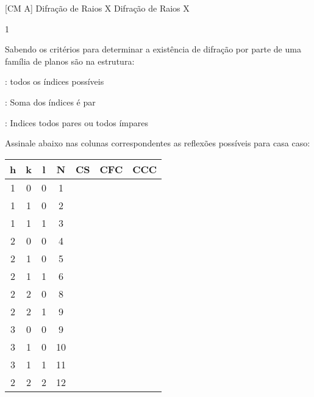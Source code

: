 \documentclass[\mainfilename]{subfiles}
\begin{document}

[CM A]
{Difração de Raios X} %
{Difração de Raios X} %


\setcounter{question}{6}

\begin{questionBox}1{ %
    Sabendo os critérios para determinar a existência de difração por parte de uma família de planos são na estrutura:
    \begin{description}[
    ]
        \item [Cúbica simples (CS)]: todos os índices possíveis
        \item [Cúbica de Corpo Centrado (CCC)]: Soma dos índices é par
        \item [Cúbica de Faces Centradas (CFC)]: Indices todos pares ou todos ímpares
    \end{description}
    Assinale abaixo nas colunas correspondentes as reflexões possíveis para casa caso:
} %
    \begin{center}
        \vspace{1ex}
        \begin{tabular}{*{7}{C}}
            \toprule
            
                h & k & l & N & CS & CFC & CCC
            
            \\\midrule
            
                   1 & 0 & 0 &  1 &  & \CellFALSE{} & \CellFALSE{}
                \\ 1 & 1 & 0 &  2 &  & \CellFALSE{} & 
                \\ 1 & 1 & 1 &  3 &  &  & \CellFALSE{}
                \\ 2 & 0 & 0 &  4 &  &  & 
                \\ 2 & 1 & 0 &  5 &  & \CellFALSE{} & \CellFALSE{}
                \\ 2 & 1 & 1 &  6 &  & \CellFALSE{} & 
                \\ 2 & 2 & 0 &  8 &  &  & 
                \\ 2 & 2 & 1 &  9 &  & \CellFALSE{} & \CellFALSE{}
                \\ 3 & 0 & 0 &  9 &  & \CellFALSE{} & \CellFALSE{}
                \\ 3 & 1 & 0 & 10 &  & \CellFALSE{} & 
                \\ 3 & 1 & 1 & 11 &  &  & \CellFALSE{}
                \\ 2 & 2 & 2 & 12 &  &  & 
            

\end{tabular}
\end{center}
\end{questionBox}
\end{document}
